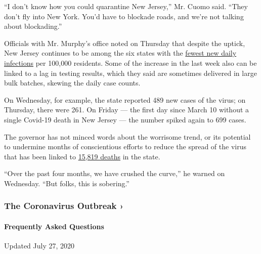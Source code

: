 ``I don't know how you could quarantine New Jersey,'' Mr. Cuomo said.
``They don't fly into New York. You'd have to blockade roads, and we're
not talking about blockading.''

Officials with Mr. Murphy's office noted on Thursday that despite the
uptick, New Jersey continues to be among the six states with the
\href{https://www.nytimes.com/interactive/2020/us/coronavirus-us-cases.html\#states}{fewest
new daily infections} per 100,000 residents. Some of the increase in the
last week also can be linked to a lag in testing results, which they
said are sometimes delivered in large bulk batches, skewing the daily
case counts.

On Wednesday, for example, the state reported 489 new cases of the
virus; on Thursday, there were 261. On Friday --- the first day since
March 10 without a single Covid-19 death in New Jersey --- the number
spiked again to 699 cases.

The governor has not minced words about the worrisome trend, or its
potential to undermine months of conscientious efforts to reduce the
spread of the virus that has been linked to
\href{https://covid19.nj.gov/}{15,819 deaths} in the state.

``Over the past four months, we have crushed the curve,'' he warned on
Wednesday. ``But folks, this is sobering.''

\href{https://www.nytimes.com/news-event/coronavirus?action=click\&pgtype=Article\&state=default\&region=MAIN_CONTENT_3\&context=storylines_faq}{}

\hypertarget{the-coronavirus-outbreak-}{%
\subsubsection{The Coronavirus Outbreak
›}\label{the-coronavirus-outbreak-}}

\hypertarget{frequently-asked-questions}{%
\paragraph{Frequently Asked
Questions}\label{frequently-asked-questions}}

Updated July 27, 2020

